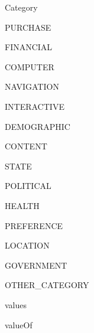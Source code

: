 \begin{jdclass}[class]{Category}
\begin{jdfield}{PURCHASE}
\end{jdfield}
\begin{jdfield}{FINANCIAL}
\jdpublic \jdfinal \jdstatic 
{}
\end{jdfield}
\begin{jdfield}{COMPUTER}
\jdpublic \jdfinal \jdstatic 
{}
\end{jdfield}
\begin{jdfield}{NAVIGATION}
\jdpublic \jdfinal \jdstatic 
{}
\end{jdfield}
\begin{jdfield}{INTERACTIVE}
\jdpublic \jdfinal \jdstatic 
{}
\end{jdfield}
\begin{jdfield}{DEMOGRAPHIC}
\jdpublic \jdfinal \jdstatic 
{}
\end{jdfield}
\begin{jdfield}{CONTENT}
\jdpublic \jdfinal \jdstatic 
{}
\end{jdfield}
\begin{jdfield}{STATE}
\jdpublic \jdfinal \jdstatic 
{}
\end{jdfield}
\begin{jdfield}{POLITICAL}
\jdpublic \jdfinal \jdstatic 
{}
\end{jdfield}
\begin{jdfield}{HEALTH}
\jdpublic \jdfinal \jdstatic 
{}
\end{jdfield}
\begin{jdfield}{PREFERENCE}
\jdpublic \jdfinal \jdstatic 
{}
\end{jdfield}
\begin{jdfield}{LOCATION}
\jdpublic \jdfinal \jdstatic 
{}
\end{jdfield}
\begin{jdfield}{GOVERNMENT}
\jdpublic \jdfinal \jdstatic 
{}
\end{jdfield}
\begin{jdfield}{OTHER\_CATEGORY}
\jdpublic \jdfinal \jdstatic 
{}
\end{jdfield}
\begin{jdmethod}{values}
\jdpublic \jdstatic 
{}
\end{jdmethod}
\begin{jdmethod}{valueOf}
\jdpublic \jdstatic 
{}
\end{jdmethod}
\end{jdclass}
